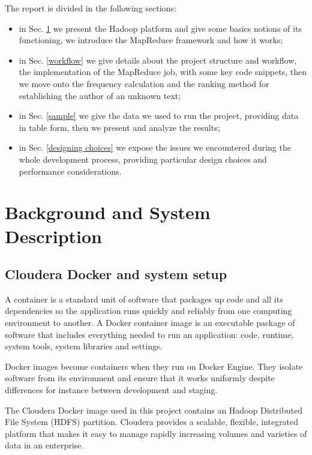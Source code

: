\documentclass[a4paper,11pt, twoside]{article}
\begin{document}
	The report is divided in the following sections: \begin{itemize}
		\item in Sec. \ref{backg} we present the Hadoop platform and give some basics notions of its functioning, we introduce the MapReduce framework and how it works;
		\item in Sec. \ref{workflow} we give details about the project structure and workflow, the implementation of the MapReduce job, with some key code snippets, then we move onto the frequency calculation and the ranking method for establishing the author of an unknown text;
		\item in Sec. \ref{sample} we give the data we used to run the project, providing data in table form, then we present and analyze the results;
		\item in Sec. \ref{designing choices} we expose the issues we encountered during the whole development process, providing particular design choices and performance considerations.
	\end{itemize}

	\section{Background and System Description}\label{backg}
    \subsection{Cloudera Docker and system setup}
		A container is a standard unit of software that packages up code and all its dependencies so the application runs quickly and reliably from one computing environment to another. A Docker container image is an executable package of software that includes everything needed to run an application: code, runtime, system tools, system libraries and settings.

		\bigskip

		\noindent
		Docker images become containers when they run on Docker Engine. They isolate software from its environment and ensure that it works uniformly despite differences for instance between development and staging.
		
		\bigskip

		\noindent
		The Cloudera\parencite{Cloudera} Docker image used in this project contains an Hadoop Distributed File System (HDFS) partition. Cloudera provides a scalable, flexible, integrated platform that makes it easy to manage rapidly increasing volumes and varieties of data in an enterprise. 
\end{document}
